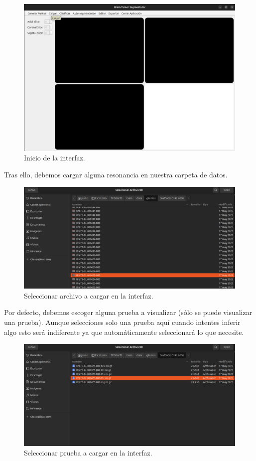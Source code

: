 \begin{figure}[H]
	\centering
	\includegraphics[width=0.7\linewidth]{imagenes/interfaz_inicio.png}
	\caption{Inicio de la interfaz.}
\end{figure}

Tras ello, debemos cargar alguna resonancia en nuestra carpeta de datos.

\begin{figure}[H]
	\centering
	\includegraphics[width=0.7\linewidth]{imagenes/interfaz_seleccarchivo.png}
	\caption{Seleccionar archivo a cargar en la interfaz.}
\end{figure}

Por defecto, debemos escoger alguna prueba a visualizar (sólo se puede visualizar una prueba). Aunque selecciones solo una prueba aquí cuando intentes inferir algo esto será indiferente ya que automáticamente seleccionará lo que necesite. 

\begin{figure}[H]
	\centering
	\includegraphics[width=0.7\linewidth]{imagenes/interfaz_seleccprueba.png}
	\caption{Seleccionar prueba a cargar en la interfaz.}
\end{figure}

